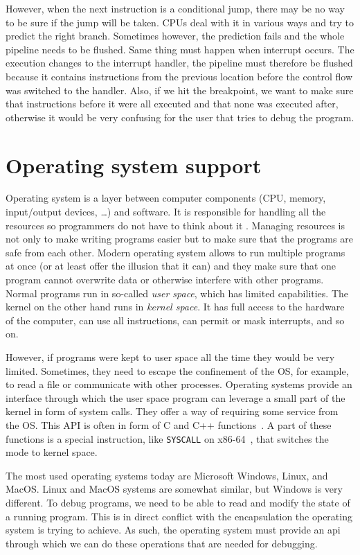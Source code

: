 However, when the next instruction is a conditional jump, there may be no way
to be sure if the jump will be taken.  CPUs deal with it in various ways and
try to predict the right branch. Sometimes however, the prediction fails and
the whole pipeline needs to be flushed. Same thing must happen when interrupt
occurs. The execution changes to the interrupt handler, the pipeline must
therefore be flushed because it contains instructions from the previous
location before the control flow was switched to the handler. Also, if we hit
the breakpoint, we want to make sure that instructions before it were all
executed and that none was executed after, otherwise it would be very confusing
for the user that tries to debug the program.

\section{Operating system support}
Operating system is a layer between computer components (CPU, memory,
input/output devices, \dots) and software. It is responsible for handling all
the resources so programmers do not have to think about it \cite{modern-os,
os-concepts}. Managing resources is not only to make writing programs easier
but to make sure that the programs are safe from each other. Modern operating
system allows to run multiple programs at once (or at least offer the illusion
that it can) and they make sure that one program cannot overwrite data or
otherwise interfere with other programs. Normal programs run in so-called
\textit{user space}, which has limited capabilities. The kernel on the other
hand runs in \textit{kernel space}. It has full access to the hardware of the
computer, can use all instructions, can permit or mask interrupts, and so on.

However, if programs were kept to user space all the time they would be very
limited. Sometimes, they need to escape the confinement of the OS, for example,
to read a file or communicate with other processes. Operating systems provide
an interface through which the user space program can leverage a small part of
the kernel in form of system calls. They offer a way of requiring some service
from the OS. This API is often in form of C and C++
functions~\cite{os-concepts}. A part of these functions is a special
instruction, like \texttt{SYSCALL} on x86-64~\cite{intel-manual}, that switches
the mode to kernel space.

The most used operating systems today are Microsoft Windows, Linux, and MacOS.
Linux and MacOS systems are somewhat similar, but Windows is very different. To
debug programs, we need to be able to read and modify the state of a running
program. This is in direct conflict with the encapsulation the operating system
is trying to achieve. As such, the operating system must provide an api through
which we can do these operations that are needed for debugging.

